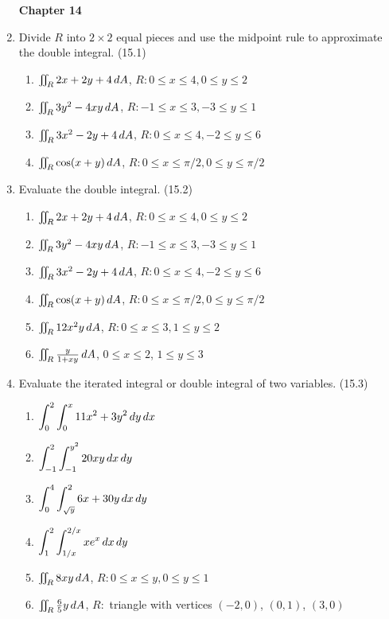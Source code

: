 \begin{enumerate}
\newpage
\centerline{\bf Chapter 14}

    \item Divide $R$ into $2\times 2$ equal pieces and use the midpoint rule to approximate the double integral. (15.1)

      \begin{enumerate}
        \item $\iint_R 2x+2y+4 \,d{A}$, $R: 0\leq x\leq 4, 0\leq y\leq 2$
        \item $\iint_R 3y^2-4xy\,d{A}$, $R: -1\leq x\leq 3, -3\leq y\leq 1$
        \item $\iint_R 3x^2-2y+4\,d{A}$, $R: 0\leq x\leq 4, -2\leq y\leq 6$
        \item $\iint_R \cos(x+y)\,d{A}$, $R: 0\leq x\leq \pi/2, 0\leq y\leq \pi/2$
      \end{enumerate}

    \item Evaluate the double integral. (15.2)

      \begin{enumerate}
        \item $\iint_R 2x+2y+4 \,d{A}$, $R: 0\leq x\leq 4, 0\leq y\leq 2$
        \item $\iint_R 3y^2-4xy\,d{A}$, $R: -1\leq x\leq 3, -3\leq y\leq 1$
        \item $\iint_R 3x^2-2y+4\,d{A}$, $R: 0\leq x\leq 4, -2\leq y\leq 6$
        \item $\iint_R \cos(x+y)\,d{A}$, $R: 0\leq x\leq \pi/2, 0\leq y\leq \pi/2$
        \item $\iint_R 12x^2y\,d{A}$, $R: 0\leq x\leq 3, 1\leq y\leq 2$
        \item $\iint_R \frac{y}{1+xy}\,d{A}$, $0\leq x\leq 2$, $1\leq y\leq 3$
      \end{enumerate}

    \item Evaluate the iterated integral or double integral of two variables. (15.3)

      \begin{enumerate}
        \item $\displaystyle\int_0^2\int_0^x 11x^2+3y^2\,d{y}\,d{x}$
        \item $\displaystyle\int_{-1}^2\int_{-1}^{y^2} 20xy\,d{x}\,d{y}$
        \item $\displaystyle\int_0^4\int_{\sqrt{y}}^2 6x+30y\,d{x}\,d{y}$
        \item $\displaystyle\int_{1}^{2}\int_{1/x}^{2/x} xe^x \,d{x}\,d{y}$
        \item $\iint_R 8xy\,d{A}$, $R: 0\leq x\leq y,0\leq y\leq 1$
        \item $\iint_R \frac{6}{5}y\,d{A}$, $R:$ triangle with vertices $(-2,0)$, $(0,1)$, $(3,0)$
      \end{enumerate}


\end{enumerate}
